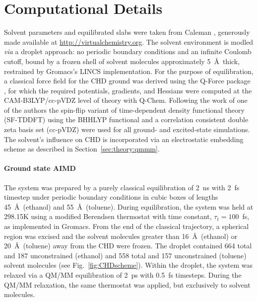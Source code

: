 \documentclass[journal=jctcce,manuscript=article,layout=traditional]{achemso}
\newcommand{\reffig}[1]{Fig.~\ref{#1}}
\begin{document}
\appendix

\section{Computational Details}
\label{sec:computation}
Solvent parameters and equilibrated slabs were taken from Caleman  \cite{Caleman2012a}, generously made available at \url{http://virtualchemistry.org}.
The solvent environment is modled \emph{via} a droplet approach: no periodic boundary conditions and an infinite Coulomb cutoff, bound by a frozen shell of solvent molecules approximately 5~\AA\ thick, restrained by Gromacs's LINCS implementation\cite{gromacs45}.
For the purpose of equilibration, a classical force field for the CHD ground was derived using the Q-Force package \cite{Sami2021}, for which the required potentials, gradients, and Hessians were computed at the CAM-B3LYP/cc-pVDZ level of theory with Q-Chem.
Following the work of one of the authors\cite{edison2020:chd} the spin-flip variant of time-dependent density functional theory (SF-TDDFT) using the BHHLYP functional and a correlation consistent double zeta basis set (cc-pVDZ) were used for all ground- and excited-state simulations.
The solvent's influence on CHD is incorporated via an electrostatic embedding scheme as described in Section~\ref{sec:theory:qmmm}.

\paragraph{Ground state AIMD}
The system was prepared by a purely classical equilibration of 2~ns with 2~fs timestep under periodic boundary conditions in cubic boxes of lengths 45~\AA\ (ethanol) and 55~\AA\ (toluene).
During equilibration, the system was held at 298.15K using a modified Berendsen thermostat with time constant, $\tau_t=100$~fs, as implemented in Gromacs. \cite{gromacs45}
From the end of the classical trajectory, a spherical region was excised and the solvent molecules greater than 16~\AA\ (ethanol) or 20~\AA\ (toluene) away from the CHD were frozen.
The droplet contained 664 total and 187 unconstrained (ethanol) and 558 total and 157 unconstrained (toluene) solvent molecules (see \reffig{fig:CHDscheme}).
Within the droplet, the system was relaxed via a QM/MM equilibration of 2~ps with 0.5~fs timesteps.
During the QM/MM relaxation, the same thermostat was applied, but exclusively to solvent molecules.
\end{document}
